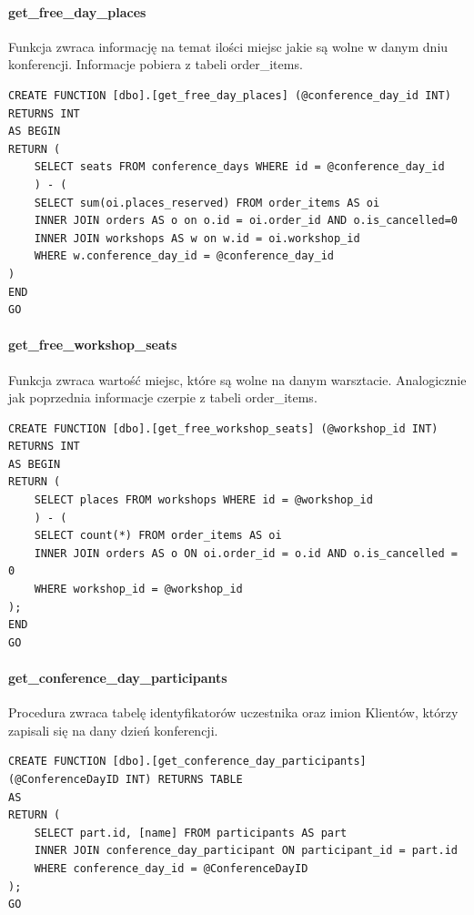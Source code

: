 \documentclass[12pt]{article}
\begin{document}
\paragraph{get\_free\_day\_places \\}
Funkcja zwraca informację na temat ilości miejsc jakie są wolne w danym dniu konferencji. Informacje pobiera z tabeli order\_items. \\
\begin{lstlisting}
CREATE FUNCTION [dbo].[get_free_day_places] (@conference_day_id INT)
RETURNS INT
AS BEGIN
RETURN (
	SELECT seats FROM conference_days WHERE id = @conference_day_id
	) - (
	SELECT sum(oi.places_reserved) FROM order_items AS oi
	INNER JOIN orders AS o on o.id = oi.order_id AND o.is_cancelled=0
	INNER JOIN workshops AS w on w.id = oi.workshop_id
	WHERE w.conference_day_id = @conference_day_id
)
END
GO
\end{lstlisting}

\paragraph{get\_free\_workshop\_seats \\}
Funkcja zwraca wartość miejsc, które są wolne na danym warsztacie. Analogicznie jak poprzednia informacje czerpie z tabeli order\_items. \\
\begin{lstlisting}
CREATE FUNCTION [dbo].[get_free_workshop_seats] (@workshop_id INT)
RETURNS INT
AS BEGIN
RETURN (
	SELECT places FROM workshops WHERE id = @workshop_id
	) - (
	SELECT count(*) FROM order_items AS oi
	INNER JOIN orders AS o ON oi.order_id = o.id AND o.is_cancelled = 0
	WHERE workshop_id = @workshop_id
);
END
GO
\end{lstlisting}
\newpage

\paragraph{get\_conference\_day\_participants \\}
Procedura zwraca tabelę identyfikatorów uczestnika oraz imion Klientów, którzy zapisali się na dany dzień konferencji. \\
\begin{lstlisting}
CREATE FUNCTION [dbo].[get_conference_day_participants]
(@ConferenceDayID INT) RETURNS TABLE
AS
RETURN (
	SELECT part.id, [name] FROM participants AS part
	INNER JOIN conference_day_participant ON participant_id = part.id
	WHERE conference_day_id = @ConferenceDayID
);
GO
\end{lstlisting}
\end{document}
